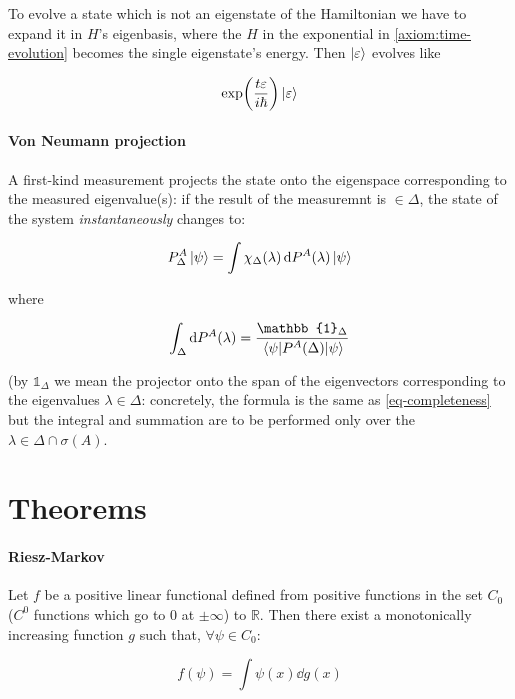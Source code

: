 \documentclass[main.tex]{subfiles}
\begin{document}
To evolve a state which is not an eigenstate of the Hamiltonian we have to expand it in $H$'s eigenbasis, where the $H$ in the exponential in \eqref{axiom:time-evolution} becomes the single eigenstate's energy. Then $\ket{\varepsilon}$ evolves like

\begin{equation}
    \exp(\frac{t \varepsilon}{i\hbar}) \ket{\varepsilon}
\end{equation}

\paragraph{Von Neumann projection} A first-kind measurement projects the state onto the eigenspace corresponding to the measured eigenvalue(s): if the result of the measuremnt is $\in \Delta$, the state of the system \emph{instantaneously} changes to:

\begin{equation}
    P^A_\Delta \ket{\psi} = \int \chi_\Delta (\lambda) \dd{P^A(\lambda)} \ket{\psi}
\end{equation}

where

\begin{equation}
    \int_\Delta \dd{P^A(\lambda)} = \frac{\mathbb{1}_\Delta}{\ev{P^A(\Delta)}{\psi}}
\end{equation}

(by $\mathbb{1}_\Delta$ we mean the projector onto the span of the eigenvectors corresponding to the eigenvalues $\lambda \in \Delta$: concretely, the formula is the same as \eqref{eq-completeness} but the integral and summation are to be performed only over the $\lambda \in \Delta \cap \sigma(A)$.

\section{Theorems}

\paragraph{Riesz-Markov} \label{th:rieszmarkov}

Let $f$ be a positive linear functional defined from positive functions in the set $C_0$ ($C^0$ functions which go to 0 at $\pm \infty$) to $\mathbb{R}$. Then there exist a monotonically increasing function $g$ such that, $\forall \psi \in C_0$:

\begin{equation}
    f(\psi) = \int \psi (x) \dd{g (x)}
\end{equation}
\end{document}
